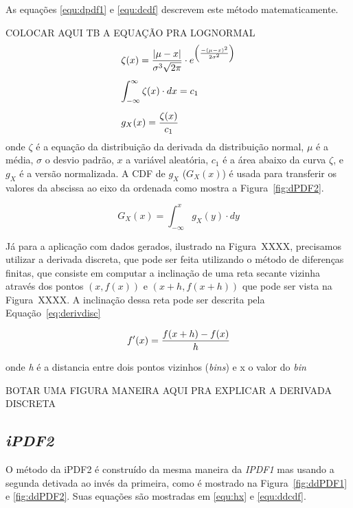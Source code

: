 As equações \eqref{equ:dpdf1} e \eqref{equ:dcdf} descrevem este método matematicamente.

\color{red} COLOCAR AQUI TB A EQUAÇÃO PRA LOGNORMAL \color{black}
\begin{equation}
\begin{array}{l}
\vspace{0.3cm}\displaystyle \zeta(x) = \frac{|\mu-x|}{\sigma^3\sqrt{2\pi}}\cdot e^{\left(\frac{-(\mu-x)^2}{2\sigma^2}\right) } \\
\vspace{0.3cm} \displaystyle \int_{-\infty}^{\infty} \zeta(x)\cdot dx = c_1 \\
\displaystyle g_X(x) = \frac{\zeta(x)}{c_1}
\label{equ:dpdf1}
\end{array}
\end{equation}
onde $\zeta$ é a equação da distribuição da derivada da distribuição normal, $\mu$ é a média, $\sigma$ o desvio padrão, $x$ a variável aleatória, $c_1$ é a área abaixo da curva $\zeta$, e $g_X$ é a versão normalizada.	
A \ac{CDF} de $g_X$ ($G_X(x)$) é usada para transferir os valores da abscissa ao eixo da ordenada como mostra a  Figura~\ref{fig:dPDF2}.

\begin{equation}
G_X(x) = \int_{-\infty}^x g_X(y)\cdot dy
\label{equ:dcdf}
\end{equation}


Já para a aplicação com dados gerados, ilustrado na Figura~XXXX, precisamos utilizar a derivada discreta, que pode ser feita utilizando o método de diferenças finitas, que consiste em computar a inclinação de uma reta secante vizinha através dos pontos $(x,f(x))$ e $(x+h,f(x+h))$ \cite{burden2001numerical} que pode ser vista na Figura~XXXX. A inclinação dessa reta pode ser descrita pela Equação~\eqref{eq:derivdisc}

\begin{equation}
	{\displaystyle f'(x) = {f(x+h)-f(x) \over h}}
	\label{eq:derivdisc}
\end{equation}

onde \textit{h} é a distancia entre dois pontos vizinhos (\textit{bins}) e x o valor do \textit{bin}

{\color{red} BOTAR UMA FIGURA MANEIRA AQUI PRA EXPLICAR A DERIVADA DISCRETA}




\subsection{\textit{iPDF2}} \label{cap:ipdf2}
O método da \ac{iPDF2} é construído da mesma maneira da \textit{IPDF1} mas usando a segunda detivada ao invés da primeira, como é mostrado na Figura~\ref{fig:ddPDF1} e \ref{fig:ddPDF2}. Suas equações são mostradas em \eqref{equ:hx} e \eqref{equ:ddcdf}.

